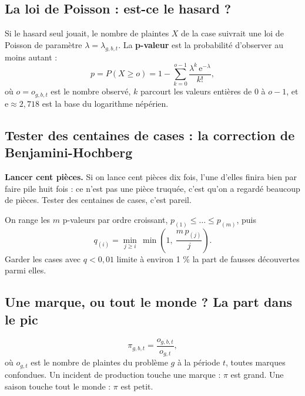 \subsection{La loi de Poisson : est-ce le hasard ?}

\begin{formulabox}
Si le hasard seul jouait, le nombre de plaintes $X$ de la case suivrait une loi de Poisson de paramètre
$\lambda = \lambda_{g,b,t}$. La \textbf{p-valeur} est la probabilité d'observer au moins autant :
\[
p = P(X \geq o) = 1 - \sum_{k=0}^{o-1} \frac{\lambda^{k}\, \mathrm{e}^{-\lambda}}{k!},
\]
où $o = o_{g,b,t}$ est le nombre observé, $k$ parcourt les valeurs entières de $0$ à $o-1$, et
$\mathrm{e} \approx 2{,}718$ est la base du logarithme népérien.
\end{formulabox}

\subsection{Tester des centaines de cases : la correction de Benjamini-Hochberg}

\begin{tcbraster}[raster columns=2, raster equal height, raster column skip=8pt, raster every box/.style={unbreakable}]
\begin{enfant}[unbreakable]
\textbf{Lancer cent pièces.} Si on lance cent pièces dix fois, l'une d'elles finira bien par faire
\og pile \fg{} huit fois : ce n'est pas une pièce truquée, c'est qu'on a regardé beaucoup de pièces.
Tester des centaines de cases, c'est pareil.
\end{enfant}
\begin{formulabox}
On range les $m$ p-valeurs par ordre croissant, $p_{(1)} \leq \ldots \leq p_{(m)}$, puis
\[
q_{(i)} = \min_{j \geq i}\, \min\!\left(1,\ \frac{m\, p_{(j)}}{j}\right).
\]
Garder les cases avec $q < 0{,}01$ limite à environ 1 \% la part de fausses découvertes parmi elles.
\end{formulabox}
\end{tcbraster}

\subsection{Une marque, ou tout le monde ? La part dans le pic}

\begin{formulabox}
\[
\pi_{g,b,t} = \frac{o_{g,b,t}}{o_{g,t}},
\]
où $o_{g,t}$ est le nombre de plaintes du problème $g$ à la période $t$, toutes marques confondues. Un
incident de production touche une marque : $\pi$ est grand. Une saison touche tout le monde : $\pi$ est petit.
\end{formulabox}

